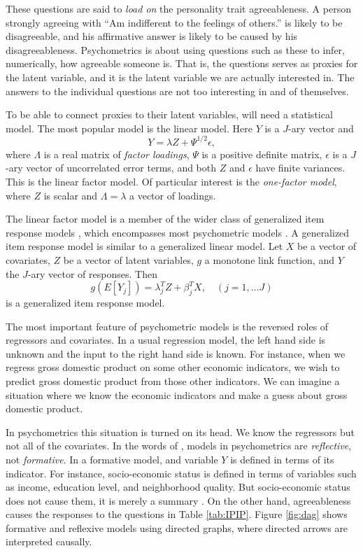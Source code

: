 These questions are said to \textit{load on} the personality trait agreeableness. A person strongly agreeing with ``Am indifferent to the feelings of others.'' is likely to be disagreeable, and his affirmative answer is likely to be caused by his disagreeableness. Psychometrics is about using questions such as these to infer, numerically, how agreeable someone is. That is, the questions serves as proxies for the latent variable, and it is the latent variable we are actually interested in. The answers to the individual questions are not too interesting in and of themselves.

To be able to connect proxies to their latent variables, will need a statistical model. The most popular model is the linear model. Here $Y$ is a $J$-ary vector and
\begin{equation}
Y=\lambda Z+\Psi^{1/2}\epsilon,\label{eq:one-factor model}
\end{equation}
where $\Lambda$ is a real matrix of \emph{factor loadings}, $\Psi$ is a positive definite matrix, $\epsilon$ is a $J$-ary vector of uncorrelated error terms, and both $Z$ and $\epsilon$ have finite variances. This is the linear factor model. Of particular interest is the \textit{one-factor model}, where $Z$ is scalar and $\Lambda = \lambda$ a vector of loadings.

The linear factor model is a member of the wider class of generalized item response models \parencite{Mellenbergh1994-iy}, which encompasses most psychometric models \parencite[Chapter 3.1]{Borsboom2005-iq}. A generalized item response model is similar to a generalized linear model. Let $X$ be a vector of covariates, $Z$ be a vector of latent variables, $g$ a monotone link function, and $Y$ the $J$-ary vector of responses. Then 
\begin{equation}
g(E[Y_{j}])=\lambda_{j}^{T}Z+\beta_{j}^{T}X,\quad(j=1,\ldots J)\label{eq:GLIRT model}
\end{equation}
is a generalized item response model.

The most important feature of psychometric models is the reversed roles of regressors and covariates. In a usual regression model, the left hand side is unknown and the input to the right hand side is known. For instance, when we regress gross domestic product on some other economic indicators, we wish to predict gross domestic product from those other indicators. We can imagine a situation where we know the economic indicators and make a guess about gross domestic product. 

In psychometrics this situation is turned on its head. We know the regressors but not all of the covariates. In the words of \textcite[p. 61]{Borsboom2005-iq}, models in psychometrics are \emph{reflective}, not \emph{formative}. In a formative model, and variable $Y$ is defined in terms of its indicator. For instance, socio-economic status is defined in terms of variables such as income, education level, and neighborhood quality. But socio-economic status does not cause them, it is merely a summary \parencite[p. 62]{Borsboom2005-iq}. On the other hand, agreeableness causes the responses to the questions in Table \ref{tab:IPIP}. Figure \ref{fig:dag} shows formative and reflexive models using directed graphs, where directed arrows are interpreted causally.

